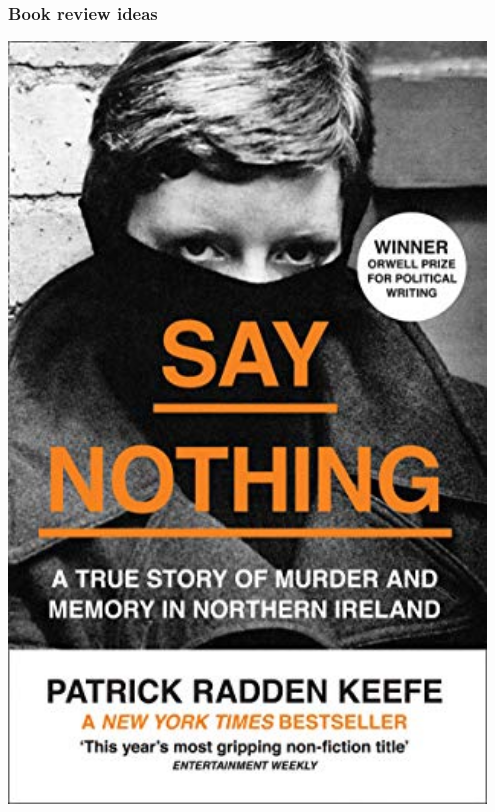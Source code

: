 \documentclass[aspectratio=43]{beamer}
\begin{document}
\begin{frame}
\frametitle{Book review ideas}
\centering

\begin{minipage}{0.45\textwidth}\centering
\includegraphics[width = 0.95\textwidth]{img/say_nothing}
\end{minipage}\hfill
\begin{minipage}{0.45\textwidth}\centering

\end{minipage}
\end{frame}
\end{document}
